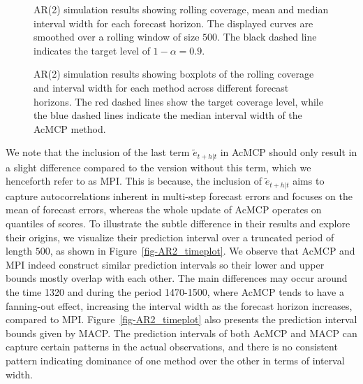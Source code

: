\documentclass[
  11pt,
  a4paper,
]{article}
\theoremstyle{plain}
\theoremstyle{plain}
\theoremstyle{remark}
\begin{document}
\begin{figure}


\caption{\label{fig-AR2_cov}AR(2) simulation results showing rolling
coverage, mean and median interval width for each forecast horizon. The
displayed curves are smoothed over a rolling window of size \(500\). The
black dashed line indicates the target level of \(1-\alpha=0.9\).}

\end{figure}%

\begin{figure}


\caption{\label{fig-AR2_box}AR(2) simulation results showing boxplots of
the rolling coverage and interval width for each method across different
forecast horizons. The red dashed lines show the target coverage level,
while the blue dashed lines indicate the median interval width of the
AcMCP method.}

\end{figure}%

We note that the inclusion of the last term \(\tilde{e}_{t+h|t}\) in
AcMCP should only result in a slight difference compared to the version
without this term, which we henceforth refer to as MPI. This is because,
the inclusion of \(\tilde{e}_{t+h|t}\) aims to capture autocorrelations
inherent in multi-step forecast errors and focuses on the mean of
forecast errors, whereas the whole update of AcMCP operates on quantiles
of scores. To illustrate the subtle difference in their results and
explore their origins, we visualize their prediction interval over a
truncated period of length \(500\), as shown in
Figure~\ref{fig-AR2_timeplot}. We observe that AcMCP and MPI indeed
construct similar prediction intervals so their lower and upper bounds
mostly overlap with each other. The main differences may occur around
the time 1320 and during the period 1470-1500, where AcMCP tends to have
a fanning-out effect, increasing the interval width as the forecast
horizon increases, compared to MPI. Figure~\ref{fig-AR2_timeplot} also
presents the prediction interval bounds given by MACP. The prediction
intervals of both AcMCP and MACP can capture certain patterns in the
actual observations, and there is no consistent pattern indicating
dominance of one method over the other in terms of interval width.
\end{document}
